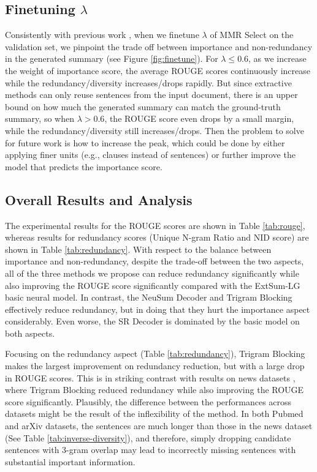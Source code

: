 \documentclass[11pt,a4paper]{article}
\begin{document}
\subsection{Finetuning $\lambda$}
\vspace{-1mm}
Consistently with previous work \cite{Jung2019}, when we finetune $\lambda$ of MMR Select on the validation set, we pinpoint the trade off between importance and non-redundancy in the generated summary (see Figure \ref{fig:finetune}). For $\lambda\leq0.6$, as we increase the weight of importance score, the average ROUGE scores continuously increase while the redundancy/diversity increases/drops rapidly. But since extractive methods can only reuse sentences from the input document, there is an upper bound on how much the generated summary can match the ground-truth summary, so when $\lambda > 0.6$, the ROUGE score even drops by a small margin, while the redundancy/diversity still increases/drops.
Then the problem to solve for future work is how to increase the peak, which could be done by either applying finer units (e.g., clauses instead of sentences) or further improve the model that predicts the importance score.
\vspace{-1mm}
\subsection{Overall Results and Analysis}
\label{result_and_analysis}
\vspace{-1mm}
The experimental results for the ROUGE scores are shown in Table \ref{tab:rouge}, whereas results for redundancy scores (Unique N-gram Ratio and NID score) are shown in Table \ref{tab:redundancy}.
With respect to the balance between importance and non-redundancy, despite the trade-off between the two aspects, all of the three methods we propose can reduce redundancy significantly while also improving the ROUGE score significantly compared with the ExtSum-LG basic neural model. In contrast, the NeuSum Decoder and Trigram Blocking effectively reduce  redundancy, but in doing that they hurt the importance aspect considerably. Even worse, the SR Decoder is dominated by the basic model on both aspects.  



Focusing on the redundancy aspect (Table \ref{tab:redundancy}), Trigram Blocking makes the largest improvement on redundancy reduction, but with a large drop in ROUGE scores. This is in striking contrast with results on news datasets \cite{liu-lapata-2019-text}, where Trigram Blocking reduced redundancy while also improving the ROUGE score significantly. Plausibly,  the difference between the performances across datasets might be the result of the inflexibility of the method. In both Pubmed and arXiv datasets, the sentences are much longer than those in the news dataset (See Table \ref{tab:inverse-diversity}), and therefore, simply dropping candidate sentences with 3-gram overlap may lead to incorrectly missing sentences with substantial important information. 
\end{document}

